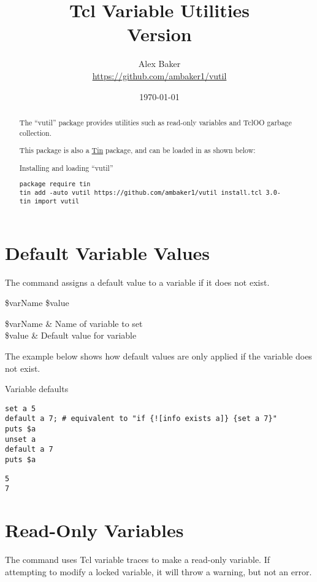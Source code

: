 \documentclass{article}
\title{\Huge Tcl Variable Utilities\\\small Version \version}
\author{Alex Baker\\\small\url{https://github.com/ambaker1/vutil}}
\date{\small\today}
\begin{document}
\maketitle
\begin{abstract}
\begin{center}
The ``vutil'' package provides utilities such as read-only variables and TclOO garbage collection.

This package is also a \textcolor{blue}{\href{https://github.com/ambaker1/Tin}{Tin}} package, and can be loaded in as shown below:
\end{center}
\begin{example}{Installing and loading ``vutil''}
\begin{lstlisting}
package require tin
tin add -auto vutil https://github.com/ambaker1/vutil install.tcl 3.0-
tin import vutil
\end{lstlisting}
\end{example}
\end{abstract}

\clearpage
\section{Default Variable Values}
The command  assigns a default value to a variable if it does not exist.
\begin{syntax}
 \$varName \$value
\end{syntax}
\begin{args}
\$varName & Name of variable to set \\
\$value & Default value for variable
\end{args}

The example below shows how default values are only applied if the variable does not exist.
\begin{example}{Variable defaults}
\begin{lstlisting}
set a 5
default a 7; # equivalent to "if {![info exists a]} {set a 7}"
puts $a
unset a
default a 7
puts $a
\end{lstlisting}
\tcblower
\begin{lstlisting}
5
7
\end{lstlisting}
\end{example}
\clearpage
\section{Read-Only Variables}
The command  uses Tcl variable traces to make a read-only variable. 
If attempting to modify a locked variable, it will throw a warning, but not an error.
\end{document}
